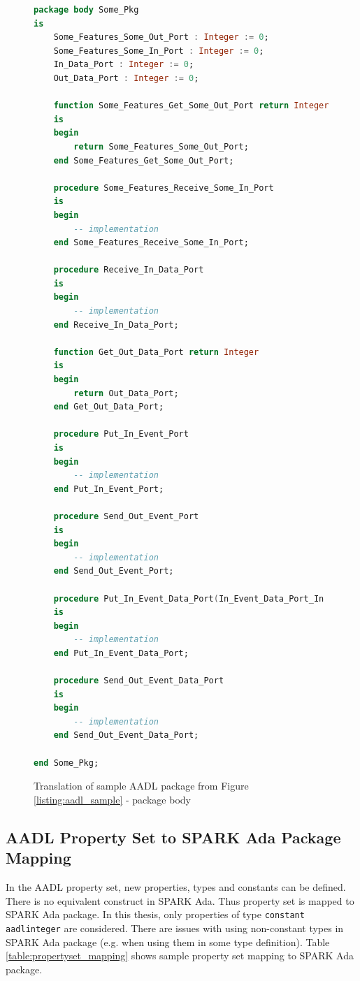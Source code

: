 \begin{figure}[ht]
\singlespacing
\begin{lstlisting}[language=ada, frame=single, gobble=0]
package body Some_Pkg
is
    Some_Features_Some_Out_Port : Integer := 0;
    Some_Features_Some_In_Port : Integer := 0;
    In_Data_Port : Integer := 0;
    Out_Data_Port : Integer := 0;

    function Some_Features_Get_Some_Out_Port return Integer
    is
    begin
        return Some_Features_Some_Out_Port;
    end Some_Features_Get_Some_Out_Port;

    procedure Some_Features_Receive_Some_In_Port
    is
    begin
        -- implementation
    end Some_Features_Receive_Some_In_Port;

    procedure Receive_In_Data_Port
    is
    begin
        -- implementation
    end Receive_In_Data_Port;

    function Get_Out_Data_Port return Integer
    is
    begin
        return Out_Data_Port;
    end Get_Out_Data_Port;

    procedure Put_In_Event_Port
    is
    begin
        -- implementation
    end Put_In_Event_Port;

    procedure Send_Out_Event_Port
    is
    begin
        -- implementation
    end Send_Out_Event_Port;

    procedure Put_In_Event_Data_Port(In_Event_Data_Port_In : Integer)
    is
    begin
        -- implementation
    end Put_In_Event_Data_Port;

    procedure Send_Out_Event_Data_Port
    is
    begin
        -- implementation
    end Send_Out_Event_Data_Port;

end Some_Pkg;
\end{lstlisting}
\doublespacing
\caption{Translation of sample AADL package from Figure \ref{listing:aadl_sample} - package body}
\label{listing:package_mapping_body}
\end{figure}



\subsection{AADL Property Set to SPARK Ada Package Mapping}
\label{codegen:mapping:propertyset}

In the AADL property set, new properties, types and constants can be defined. There is no equivalent construct in SPARK Ada. Thus property set is mapped to SPARK Ada package. In this thesis, only properties of type \lstinline{constant aadlinteger} are considered. There are issues with using non-constant types in SPARK Ada package (e.g. when using them in some type definition). Table \ref{table:propertyset_mapping} shows sample property set mapping to SPARK Ada package.

